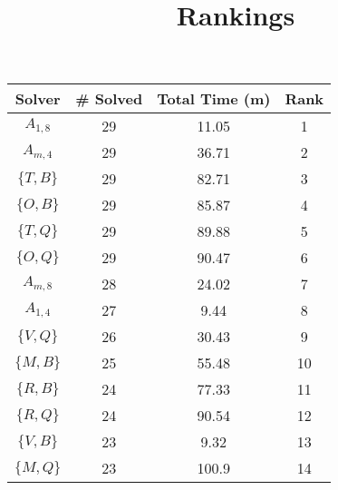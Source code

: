 \documentclass{article}
\title{Rankings}
\begin{document}
\maketitle

\begin{table}[ht!]
\centering

\begin{tabular}{|c||c|c||c|}\hline
Solver   & \# Solved & Total Time (m) & Rank \\\hline\hline
$A_{1,8}$   &  29    &  11.05   & 1\\\hline
$A_{m,4}$   &  29    &  36.71   & 2\\\hline
$\{T, B\}$  &  29    &  82.71   & 3\\\hline
$\{O, B\}$  &  29    &  85.87   & 4\\\hline
$\{T, Q\}$  &  29    &  89.88   & 5\\\hline
$\{O, Q\}$  &  29    &  90.47   & 6\\\hline
$A_{m,8}$   &  28    &  24.02   & 7\\\hline
$A_{1,4}$   &  27    &  9.44   & 8\\\hline
$\{V, Q\}$  &  26    &  30.43   & 9\\\hline
$\{M, B\}$  &  25    &  55.48   & 10\\\hline
$\{R, B\}$  &  24    &  77.33   & 11\\\hline
$\{R, Q\}$  &  24    &  90.54   & 12\\\hline
$\{V, B\}$  &  23    &  9.32   & 13\\\hline
$\{M, Q\}$  &  23    &  100.9   & 14\\\hline
\end{tabular}
\end{table}
\end{document}
